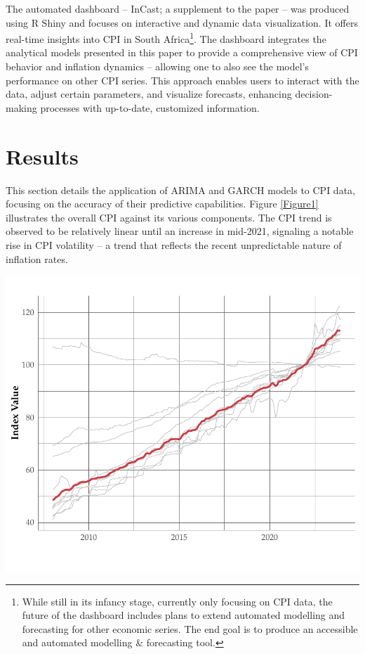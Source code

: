 \documentclass[11pt,preprint, authoryear]{elsarticle}
\let\origfigure\figure
\let\endorigfigure\endfigure
\renewenvironment{figure}[1][2] {
    \expandafter\origfigure\expandafter[H]
} {
    \endorigfigure
}
\numberwithin{equation}{section}
\numberwithin{figure}{section}
\numberwithin{table}{section}
\let\rmarkdownfootnote\footnote%
\def\footnote{\protect\rmarkdownfootnote}
\begin{document}
The automated dashboard -- InCast; a supplement to the paper -- was
produced using R Shiny and focuses on interactive and dynamic data
visualization. It offers real-time insights into CPI in South
Africa\footnote{While still in its infancy stage, currently only
  focusing on CPI data, the future of the dashboard includes plans to
  extend automated modelling and forecasting for other economic series.
  The end goal is to produce an accessible and automated modelling \&
  forecasting tool.}. The dashboard integrates the analytical models
presented in this paper to provide a comprehensive view of CPI behavior
and inflation dynamics -- allowing one to also see the model's
performance on other CPI series. This approach enables users to interact
with the data, adjust certain parameters, and visualize forecasts,
enhancing decision-making processes with up-to-date, customized
information.

\hypertarget{results}{%
\section{\texorpdfstring{Results
\label{Results}}{Results }}\label{results}}

This section details the application of ARIMA and GARCH models to CPI
data, focusing on the accuracy of their predictive capabilities. Figure
\ref{Figure1} illustrates the overall CPI against its various
components. The CPI trend is observed to be relatively linear until an
increase in mid-2021, signaling a notable rise in CPI volatility -- a
trend that reflects the recent unpredictable nature of inflation rates.

\begin{figure}
\centering
\includegraphics{FMX-Proj-Write_Up_files/figure-latex/plot_cpi-1.pdf}
\caption{CPI for All Items Over Time. CPI (all items) in red. Grey lines
represent other CPI components. \label{Figure1}}
\end{figure}
\end{document}
